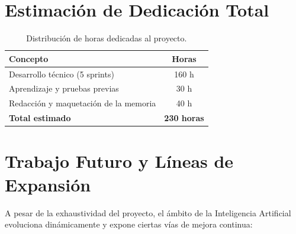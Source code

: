 \section{Estimación de Dedicación Total}

\begin{table}[H]
\centering
\caption{Distribución de horas dedicadas al proyecto.}
\label{tab:horas}
\begin{tabular}{lc}
\toprule
\textbf{Concepto} & \textbf{Horas} \\
\midrule
Desarrollo técnico (5 sprints) & 160 h \\
Aprendizaje y pruebas previas & 30 h \\
Redacción y maquetación de la memoria & 40 h \\
\midrule
\textbf{Total estimado} & \textbf{230 horas} \\
\bottomrule
\end{tabular}
\end{table}

\section{Trabajo Futuro y Líneas de Expansión}
A pesar de la exhaustividad del proyecto, el ámbito de la Inteligencia Artificial evoluciona dinámicamente y expone ciertas vías de mejora continua:

